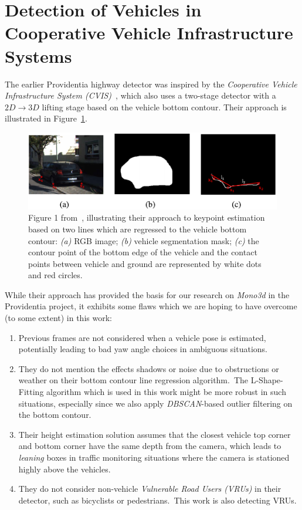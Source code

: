 \section{Detection of Vehicles in Cooperative Vehicle Infrastructure Systems}
\label{sec:related-coopvis}

The earlier Providentia highway detector was inspired by the \textit{Cooperative Vehicle Infrastructure System (CVIS)}~\cite{guo2021detection}, which also uses a two-stage detector with a $2D \rightarrow 3D$ lifting stage based on the vehicle bottom contour.
Their approach is illustrated in Figure~\ref{fig:related-cvis}.

\begin{figure}[htb]
    \centering
    \includegraphics[width=1.0\linewidth]{figures/cvis_figure}
    \caption{Figure 1 from~\cite{guo2021detection}, illustrating their approach to keypoint estimation based on two lines which are regressed to the vehicle bottom contour: \textit{(a)} RGB image; \textit{(b)} vehicle segmentation mask; \textit{(c)} the contour point of the bottom edge of the vehicle and the contact points between vehicle and ground are represented by white dots and red circles.}
    \label{fig:related-cvis}
\end{figure}

While their approach has provided the basis for our research on \textit{Mono3d} in the Providentia project, it exhibits some flaws which we are hoping to have overcome (to some extent) in this work:

\begin{enumerate}
    \item Previous frames are not considered when a vehicle pose is estimated, potentially leading to bad yaw angle choices in ambiguous situations.
    \item They do not mention the effects shadows or noise due to obstructions or weather on their bottom contour line regression algorithm.\ The L-Shape-Fitting algorithm which is used in this work might be more robust in such situations, especially since we also apply \textit{DBSCAN}-based outlier filtering on the bottom contour.
    \item Their height estimation solution assumes that the closest vehicle top corner and bottom corner have the same depth from the camera, which leads to \textit{leaning} boxes in traffic monitoring situations where the camera is stationed highly above the vehicles.
    \item They do not consider non-vehicle \textit{Vulnerable Road Users (VRUs)} in their detector, such as bicyclists or pedestrians.\ This work is also detecting VRUs.
\end{enumerate}

